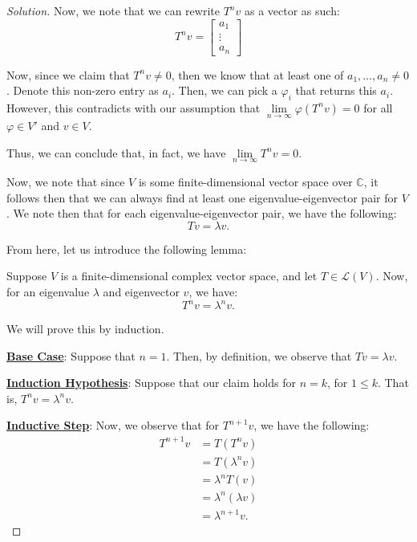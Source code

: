 \documentclass{article}
\newenvironment{solution}{\begin{proof}[Solution]}{\end{proof}}
\renewcommand\qedsymbol{$\blacksquare$}
\newenvironment{innerproof}{\renewcommand{\qedsymbol}{$\square$}\proof}{\endproof}
\newcommand{\CC}{\mathbb{C}}
\begin{document}
\begin{solution}
\begin{innerproof}
			Now, we note that we can rewrite $T^{n}v$ as a vector as such:
			\begin{equation*}
				T^{n}v =
				\begin{bmatrix}
					a_{1} \\ \vdots \\ a_{n}
				\end{bmatrix}
			\end{equation*}
		
			Now, since we claim that $T^{n}v \neq 0$, then we know that at least one of $a_{1}, \ldots, a_{n} \neq 0$. Denote this non-zero entry as $a_{i}$. Then, we can pick a $\varphi_i$ that returns this $a_{i}$. However, this contradicts with our assumption that $\lim\limits_{n \rightarrow \infty} \varphi (T^{n}v) = 0$ for all $\varphi \in V'$ and $v \in V$.
			
			Thus, we can conclude that, in fact, we have $\lim\limits_{n \rightarrow \infty} T^{n}v = 0$.
		\end{innerproof}
		
		Now, we note that since $V$ is some finite-dimensional vector space over $\CC$, it follows then that we can always find at least one eigenvalue-eigenvector pair for $V$. We note then that for each eigenvalue-eigenvector pair, we have the following:
		\begin{equation*}
			Tv = \lambda v.
		\end{equation*}
	
		From here, let us introduce the following lemma:
		\begin{lem}
			Suppose $V$ is a finite-dimensional complex vector space, and let $T \in \mathcal L(V)$. Now, for an eigenvalue $\lambda$ and eigenvector $v$, we have:
			\begin{equation*}
				T^{n}v = \lambda^{n}v.
			\end{equation*}
		\end{lem}
		\begin{innerproof}
			We will prove this by induction.
			
			\textbf{\underline{Base Case}}: Suppose that $n = 1$. Then, by definition, we observe that $Tv = \lambda v$.
			
			\textbf{\underline{Induction Hypothesis}}: Suppose that our claim holds for $n = k$, for $1 \leq k$. That is, $T^{n}v = \lambda^{n}v$.
			
			\textbf{\underline{Inductive Step}}: Now, we observe that for $T^{n+1}v$, we have the following:
			\begin{align*}
				T^{n+1}v &= T(T^{n}v) \\
				&= T(\lambda^{n} v) \\
				&= \lambda^{n}T(v) \\
				&= \lambda^{n}(\lambda v) \\
				&= \lambda^{n+1}v.
			\end{align*}
		\end{innerproof}
	

\end{solution}
\end{document}

